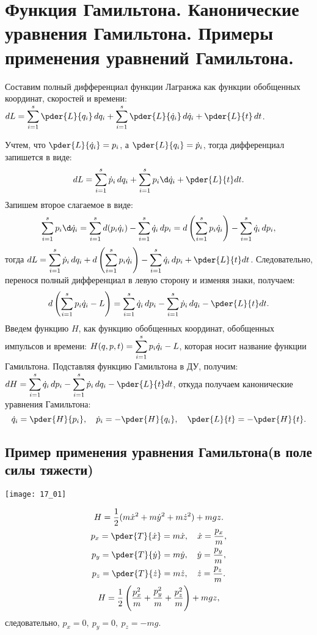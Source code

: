\chapter{Функция Гамильтона. Канонические уравнения Гамильтона. Примеры
применения уравнений Гамильтона.}

Составим полный дифференциал функции Лагранжа как функции обобщенных координат,
скоростей и времени:
\( \ds dL = \sum_{i=1}^s \pder{L}{q_i}\,dq_i + \sum_{i=1}^s \pder{L}{\dot{q}_i}
\,d\dot{q}_i + \pder{L}{t}\,dt \).

Учтем, что \( \ds \pder{L}{\dot{q}_i} = p_i \), а \( \ds \pder{L}{q_i} =
\dot{p}_i \), тогда дифференциал запишется в виде:
\[
    dL = \sum_{i=1}^s \dot{p}_i\,dq_i + \sum_{i=1}^s p_i\d\dot{q}_i +
    \pder{L}{t}dt.
\]
Запишем второе слагаемое в виде:
\[
    \sum_{i=1}^s p_i\d\dot{q}_i = \sum_{i=1}^s d(p_i\dot{q}_i) - \sum_{i=1}^s
    \dot{q}_i\,dp_i = d\left(\sum_{i=1}^s p_i\dot{q}_i\right) - \sum_{i=1}^s
    \dot{q}_i\,dp_i,
\]
тогда \( \ds dL = \sum_{i=1}^s \dot{p}_i\,dq_i + d\left(\sum_{i=1}^s
p_i\dot{q}_i\right) - \sum_{i=1}^s\dot{q}_i\,dp_i + \pder{L}{t}dt \).
Следовательно, перенося полный дифференциал в левую сторону и изменяя знаки,
получаем:
\[
    d\left(\sum_{i=1}^s p_i\dot{q}_i - L\right) = \sum_{i=1}^s\dot{q}_i\,dp_i -
    \sum_{i=1}^s \dot{p}_i\,dq_i - \pder{L}{t}dt.
\]
Введем функцию \( H \), как функцию обобщенных координат, обобщенных импульсов и времени:
\( \displaystyle H(q, p, t) = \sum_{i=1}^s p_i\dot{q}_i - L \), которая носит название
функции Гамильтона. Подставляя функцию Гамильтона в ДУ, получим: \( \ds dH =
\sum_{i=1}^s\dot{q}_i\,dp_i - \sum_{i=1}^s \dot{p}_i\,dq_i - \pder{L}{t}dt \),
откуда получаем канонические уравнения Гамильтона:
\[
    \dot{q}_i = \pder{H}{p_i}, \quad \dot{p}_i = -\pder{H}{q_i}, \quad
    \pder{L}{t} = -\pder{H}{t}.
\]

\section{Пример применения уравнения Гамильтона(в поле силы тяжести)}
\begin{minipage}{.4\textwidth}
    \texttt{[image: 17\_01]}
\end{minipage} \hfill
\begin{minipage}{.55\textwidth}
    \begin{gather*}
        H = \frac{1}{2}(m\dot{x}^2 + m\dot{y}^2 + m\dot{z}^2) + mgz. \\
        p_x = \pder{T}{\dot{x}} = m\dot{x}, \quad \dot{x} = \frac{p_x}{m}, \\
        p_y = \pder{T}{\dot{y}} = m\dot{y}, \quad \dot{y} = \frac{p_y}{m}, \\
        p_z = \pder{T}{\dot{z}} = m\dot{z}, \quad \dot{z} = \frac{p_z}{m}. \\
        H = \frac{1}{2}\left( \frac{p_x^2}{m} + \frac{p_y^2}{m} +
        \frac{p_z^2}{m} \right) + mgz,
    \end{gather*}
    следовательно, \( p_x = 0,\ p_y = 0,\ p_z = -mg \).
\end{minipage}

\newpage
